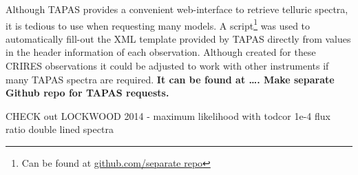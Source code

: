 Although {TAPAS} provides a convenient web-interface to retrieve telluric spectra, it is tedious to use when requesting many models. A script\footnote{Can be found at \url{github.com/separate repo}} was used to automatically fill-out the XML template provided by {TAPAS} directly from values in the header information of each observation. Although created for these {CRIRES} observations it could be adjusted to work with other instruments if many {TAPAS} spectra are required. \textbf{It can be found at \ldots. Make separate Github repo for {TAPAS} requests.}






CHECK out LOCKWOOD 2014 - maximum likelihood with todcor 1e-4 flux ratio double lined spectra
